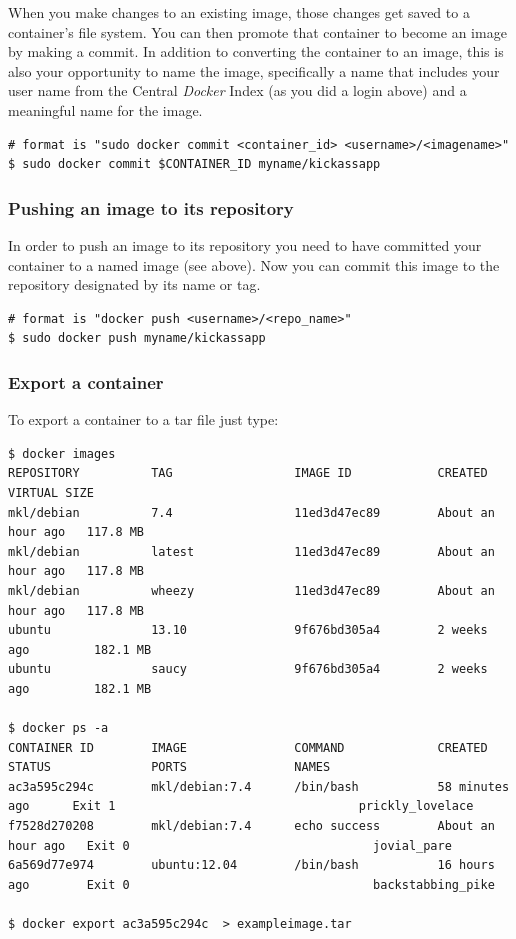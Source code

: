 \documentclass[11pt]{article}
\begin{document}
When you make changes to an existing image, those changes get saved to a container’s file system. You can then promote that container to become an image by making a commit. In addition to converting the container to an image, this is also your opportunity to name the image, specifically a name that includes your user name from the Central \emph{Docker} Index (as you did a login above) and a meaningful name for the image.

\begin{verbatim}
# format is "sudo docker commit <container_id> <username>/<imagename>"
$ sudo docker commit $CONTAINER_ID myname/kickassapp
\end{verbatim}
\subsubsection{Pushing an image to its repository}
\label{sec-2-3-9}

In order to push an image to its repository you need to have committed your container to a named image (see above).
Now you can commit this image to the repository designated by its name or tag.

\begin{verbatim}
# format is "docker push <username>/<repo_name>"
$ sudo docker push myname/kickassapp
\end{verbatim}
\subsubsection{Export a container}
\label{sec-2-3-10}

To export a container to a tar file just type:

\begin{verbatim}
$ docker images
REPOSITORY          TAG                 IMAGE ID            CREATED             VIRTUAL SIZE
mkl/debian          7.4                 11ed3d47ec89        About an hour ago   117.8 MB
mkl/debian          latest              11ed3d47ec89        About an hour ago   117.8 MB
mkl/debian          wheezy              11ed3d47ec89        About an hour ago   117.8 MB
ubuntu              13.10               9f676bd305a4        2 weeks ago         182.1 MB
ubuntu              saucy               9f676bd305a4        2 weeks ago         182.1 MB

$ docker ps -a
CONTAINER ID        IMAGE               COMMAND             CREATED             STATUS              PORTS               NAMES
ac3a595c294c        mkl/debian:7.4      /bin/bash           58 minutes ago      Exit 1                                  prickly_lovelace    
f7528d270208        mkl/debian:7.4      echo success        About an hour ago   Exit 0                                  jovial_pare         
6a569d77e974        ubuntu:12.04        /bin/bash           16 hours ago        Exit 0                                  backstabbing_pike 

$ docker export ac3a595c294c  > exampleimage.tar
\end{verbatim}
\end{document}

